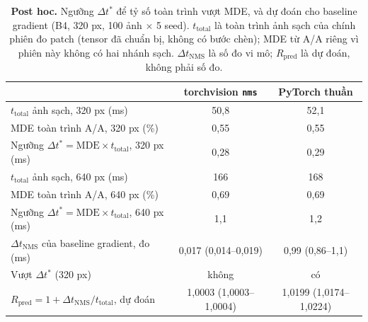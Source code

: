 \begin{table}[t]
\centering\small
\caption{\textbf{Post hoc.} Ngưỡng $\Delta t^{*}$ để tỷ số toàn trình vượt MDE, và dự đoán cho baseline gradient (B4, 320 px, 100 ảnh $\times$ 5 seed). $t_{\mathrm{total}}$ là toàn trình ảnh sạch của chính phiên đo patch (tensor đã chuẩn bị, không có bước chèn); MDE từ A/A riêng vì phiên này không có hai nhánh sạch. $\Delta t_{\mathrm{NMS}}$ là số đo vi mô; $R_{\mathrm{pred}}$ là dự đoán, không phải số đo.}
\label{tab:threshold}
\begin{tabular}{@{}lcc@{}}
\toprule
 & torchvision \texttt{nms} & PyTorch thuần \\
\midrule
$t_{\mathrm{total}}$ ảnh sạch, 320 px (ms) & 50,8 & 52,1 \\
MDE toàn trình A/A, 320 px (\%) & 0,55 & 0,55 \\
Ngưỡng $\Delta t^{*}=\mathrm{MDE}\times t_{\mathrm{total}}$, 320 px (ms) & 0,28 & 0,29 \\
$t_{\mathrm{total}}$ ảnh sạch, 640 px (ms) & 166 & 168 \\
MDE toàn trình A/A, 640 px (\%) & 0,69 & 0,69 \\
Ngưỡng $\Delta t^{*}=\mathrm{MDE}\times t_{\mathrm{total}}$, 640 px (ms) & 1,1 & 1,2 \\
\midrule
$\Delta t_{\mathrm{NMS}}$ của baseline gradient, đo (ms) & 0,017 (0,014--0,019) & 0,99 (0,86--1,1) \\
Vượt $\Delta t^{*}$ (320 px) & không & có \\
$R_{\mathrm{pred}} = 1+\Delta t_{\mathrm{NMS}}/t_{\mathrm{total}}$, dự đoán & 1,0003 (1,0003--1,0004) & 1,0199 (1,0174--1,0224) \\
\bottomrule
\end{tabular}
\end{table}
